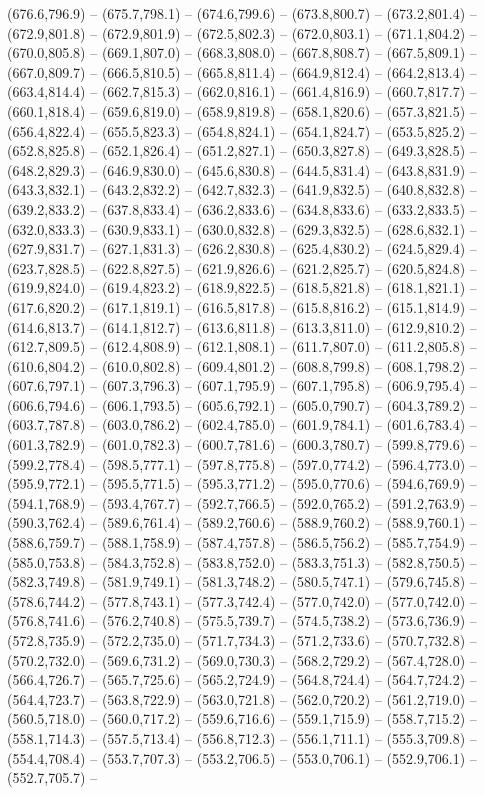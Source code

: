 (676.6,796.9) -- (675.7,798.1) -- (674.6,799.6) -- (673.8,800.7) -- (673.2,801.4) -- (672.9,801.8) -- (672.9,801.9) -- (672.5,802.3) -- (672.0,803.1) -- (671.1,804.2) -- (670.0,805.8) -- (669.1,807.0) -- (668.3,808.0) -- (667.8,808.7) -- (667.5,809.1) -- (667.0,809.7) -- (666.5,810.5) -- (665.8,811.4) -- (664.9,812.4) -- (664.2,813.4) -- (663.4,814.4) -- (662.7,815.3) -- (662.0,816.1) -- (661.4,816.9) -- (660.7,817.7) -- (660.1,818.4) -- (659.6,819.0) -- (658.9,819.8) -- (658.1,820.6) -- (657.3,821.5) -- (656.4,822.4) -- (655.5,823.3) -- (654.8,824.1) -- (654.1,824.7) -- (653.5,825.2) -- (652.8,825.8) -- (652.1,826.4) -- (651.2,827.1) -- (650.3,827.8) -- (649.3,828.5) -- (648.2,829.3) -- (646.9,830.0) -- (645.6,830.8) -- (644.5,831.4) -- (643.8,831.9) -- (643.3,832.1) -- (643.2,832.2) -- (642.7,832.3) -- (641.9,832.5) -- (640.8,832.8) -- (639.2,833.2) -- (637.8,833.4) -- (636.2,833.6) -- (634.8,833.6) -- (633.2,833.5) -- (632.0,833.3) -- (630.9,833.1) -- (630.0,832.8) -- (629.3,832.5) -- (628.6,832.1) -- (627.9,831.7) -- (627.1,831.3) -- (626.2,830.8) -- (625.4,830.2) -- (624.5,829.4) -- (623.7,828.5) -- (622.8,827.5) -- (621.9,826.6) -- (621.2,825.7) -- (620.5,824.8) -- (619.9,824.0) -- (619.4,823.2) -- (618.9,822.5) -- (618.5,821.8) -- (618.1,821.1) -- (617.6,820.2) -- (617.1,819.1) -- (616.5,817.8) -- (615.8,816.2) -- (615.1,814.9) -- (614.6,813.7) -- (614.1,812.7) -- (613.6,811.8) -- (613.3,811.0) -- (612.9,810.2) -- (612.7,809.5) -- (612.4,808.9) -- (612.1,808.1) -- (611.7,807.0) -- (611.2,805.8) -- (610.6,804.2) -- (610.0,802.8) -- (609.4,801.2) -- (608.8,799.8) -- (608.1,798.2) -- (607.6,797.1) -- (607.3,796.3) -- (607.1,795.9) -- (607.1,795.8) -- (606.9,795.4) -- (606.6,794.6) -- (606.1,793.5) -- (605.6,792.1) -- (605.0,790.7) -- (604.3,789.2) -- (603.7,787.8) -- (603.0,786.2) -- (602.4,785.0) -- (601.9,784.1) -- (601.6,783.4) -- (601.3,782.9) -- (601.0,782.3) -- (600.7,781.6) -- (600.3,780.7) -- (599.8,779.6) -- (599.2,778.4) -- (598.5,777.1) -- (597.8,775.8) -- (597.0,774.2) -- (596.4,773.0) -- (595.9,772.1) -- (595.5,771.5) -- (595.3,771.2) -- (595.0,770.6) -- (594.6,769.9) -- (594.1,768.9) -- (593.4,767.7) -- (592.7,766.5) -- (592.0,765.2) -- (591.2,763.9) -- (590.3,762.4) -- (589.6,761.4) -- (589.2,760.6) -- (588.9,760.2) -- (588.9,760.1) -- (588.6,759.7) -- (588.1,758.9) -- (587.4,757.8) -- (586.5,756.2) -- (585.7,754.9) -- (585.0,753.8) -- (584.3,752.8) -- (583.8,752.0) -- (583.3,751.3) -- (582.8,750.5) -- (582.3,749.8) -- (581.9,749.1) -- (581.3,748.2) -- (580.5,747.1) -- (579.6,745.8) -- (578.6,744.2) -- (577.8,743.1) -- (577.3,742.4) -- (577.0,742.0) -- (577.0,742.0) -- (576.8,741.6) -- (576.2,740.8) -- (575.5,739.7) -- (574.5,738.2) -- (573.6,736.9) -- (572.8,735.9) -- (572.2,735.0) -- (571.7,734.3) -- (571.2,733.6) -- (570.7,732.8) -- (570.2,732.0) -- (569.6,731.2) -- (569.0,730.3) -- (568.2,729.2) -- (567.4,728.0) -- (566.4,726.7) -- (565.7,725.6) -- (565.2,724.9) -- (564.8,724.4) -- (564.7,724.2) -- (564.4,723.7) -- (563.8,722.9) -- (563.0,721.8) -- (562.0,720.2) -- (561.2,719.0) -- (560.5,718.0) -- (560.0,717.2) -- (559.6,716.6) -- (559.1,715.9) -- (558.7,715.2) -- (558.1,714.3) -- (557.5,713.4) -- (556.8,712.3) -- (556.1,711.1) -- (555.3,709.8) -- (554.4,708.4) -- (553.7,707.3) -- (553.2,706.5) -- (553.0,706.1) -- (552.9,706.1) -- (552.7,705.7) -- 